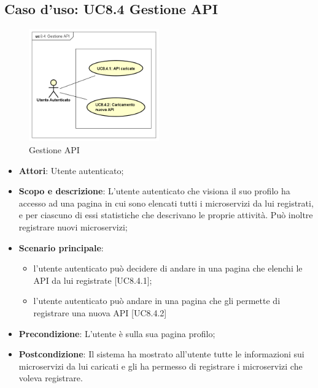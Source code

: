 \documentclass[12pt,a4paper,titlepage]{article}
\begin{document}
	\subsection{Caso d'uso: UC8.4 Gestione API}
	\label{UC8.4}
	\begin{figure}[H]
		\centering
		\includegraphics[width=0.5\textwidth]{UseCase/GestioneAPI}
		\caption{Gestione API}
	\end{figure}
	\begin{itemize}
		\item \textbf{Attori}: Utente autenticato;
		\item \textbf{Scopo e descrizione}: L'utente autenticato che visiona il suo profilo ha accesso ad una pagina in cui sono elencati tutti i microservizi da lui registrati, e per ciascuno di essi statistiche che descrivano le proprie attività. Può inoltre registrare nuovi microservizi;
		\item \textbf{Scenario principale}:
			\begin{itemize}
				\item l'utente autenticato può decidere di andare in una pagina che elenchi le API da lui registrate [UC8.4.1];
				\item l'utente autenticato può andare in una pagina che gli permette di registrare una nuova API [UC8.4.2]
			\end{itemize}
		\item \textbf{Precondizione}: L'utente è sulla sua pagina profilo;
		\item \textbf{Postcondizione}: Il sistema ha mostrato all'utente tutte le informazioni sui microservizi da lui caricati e gli ha permesso di registrare i microservizi che voleva registrare.
	\end{itemize}
\end{document}
